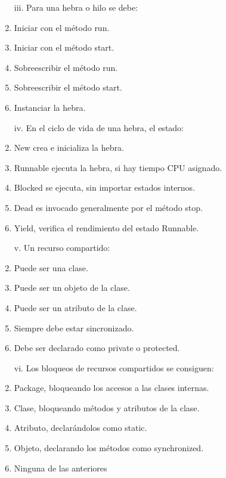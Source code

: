 \documentclass[10pt]{article}
\begin{document}
{\begin{enumerate}
\begin{multicols}{2}
    \begin{enumerate}[label=(\alph*)]
        \item[iii.] Para una hebra o hilo se debe:
        \item Iniciar con el m\'etodo run.
        \item Iniciar con el m\'etodo start.
        \item Sobreescribir el m\'etodo run.
        \item Sobreescribir el m\'etodo start.
        \item Instanciar la hebra.
    \end{enumerate}

    \begin{enumerate}[label=(\alph*)]
        \item[iv.] En el ciclo de vida de una hebra, el estado: 
        \item New crea e inicializa la hebra.
        \item Runnable ejecuta la hebra, si hay tiempo CPU asignado.
        \item Blocked se ejecuta, sin importar estados internos.
        \item Dead es invocado generalmente por el m\'etodo stop.
        \item Yield, verifica el rendimiento del estado Runnable.
    \end{enumerate}

    \begin{enumerate}[label=(\alph*)]
        \item[v.] Un recurso compartido:
        \item Puede ser una clase.
        \item Puede ser un objeto de la clase.
        \item Puede ser un atributo de la clase.
        \item Siempre debe estar sincronizado.
        \item Debe ser declarado como private o protected.
    \end{enumerate}

    \begin{enumerate}[label=(\alph*)]
        \item[vi.] Los bloqueos de recursos compartidos se consiguen:
        \item Package, bloqueando los accesos a las clases internas.
        \item Clase, bloqueando m\'etodos y atributos de la clase.
        \item Atributo, declar\'andolos como static.
        \item Objeto, declarando los m\'etodos como synchronized.
        \item Ninguna de las anteriores
    \end{enumerate}


\end{multicols}
\end{enumerate}}
\end{document}
